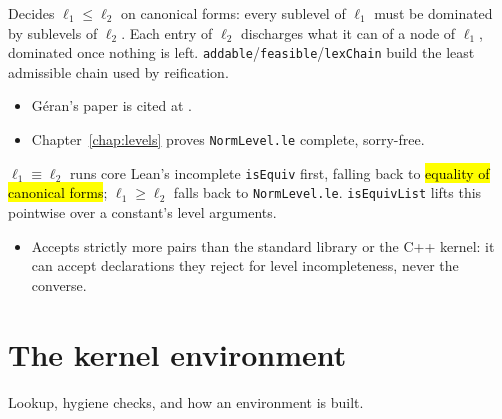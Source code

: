 \begin{definition}
\label{def:kernel-level-le}
\leanok
{}

 Decides $\ell_1 \le \ell_2$ on canonical forms: every sublevel of $\ell_1$ must be
dominated by sublevels of $\ell_2$. Each entry of $\ell_2$ discharges what it can of a node of
$\ell_1$, dominated once nothing is left. \texttt{addable}/\texttt{feasible}/\texttt{lexChain}
build the least admissible chain used by reification.
\begin{itemize}
\item G\'eran's paper is cited at .
\item {} Chapter~\ref{chap:levels} proves \texttt{NormLevel.le} complete, sorry-free.
\end{itemize}
\end{definition}

\begin{definition}
\label{def:kernel-level-isequiv}
\leanok
{}

 $\ell_1 \equiv \ell_2$ runs core Lean's incomplete \texttt{isEquiv} first, falling
back to \hl{equality of canonical forms}; $\ell_1 \ge \ell_2$ falls back to \texttt{NormLevel.le}.
\texttt{isEquivList} lifts this pointwise over a constant's level arguments.
\begin{itemize}
\item {} Accepts strictly more pairs than the standard library or the C++ kernel: it can
accept declarations they reject for level incompleteness, never the converse.
\end{itemize}
\end{definition}

\section{The kernel environment}

Lookup, hygiene checks, and how an environment is built.

